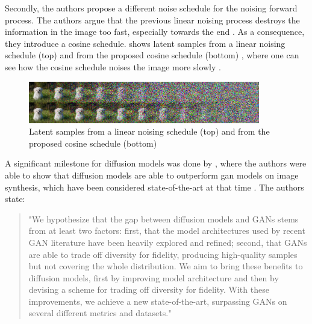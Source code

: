 Secondly, the authors propose a different noise schedule for the noising forward process.
The authors argue that the previous linear noising process destroys the information in the image too fast, especially towards the end \cite{nichol2021ImprovedDenoisingDiffusion}.
As a consequence, they introduce a cosine schedule.
 shows latent samples from a linear noising schedule (top) and from the proposed cosine schedule (bottom) \cite[Figure 3, p. 4]{nichol2021ImprovedDenoisingDiffusion}, where one can see how the cosine schedule noises the image more slowly \cite{nichol2021ImprovedDenoisingDiffusion}.

\begin{figure}[h]
    \centering
    \includegraphics[width=0.9\textwidth]{images/cosine.png}
    \caption[Noising Schedule]{Latent samples from a linear noising schedule (top) and from the proposed cosine schedule (bottom) \cite[Figure 3, p. 4]{nichol2021ImprovedDenoisingDiffusion}}
    \label{fig:cosine}
\end{figure}

A significant milestone for diffusion \glspl{model} was done by \textcite{dhariwal2021DiffusionModelsBeat}, where the authors were able to show that diffusion \glspl{model} are able to outperform \gls{gan}
\glspl{model} on image synthesis, which have been considered state-of-the-art at that time \cite{dhariwal2021DiffusionModelsBeat}.
The authors state:

\begin{quotation}
    "We hypothesize that the gap between diffusion \glspl{model} and GANs stems from at least two factors: 
    first, that the \gls{model} architectures used by recent GAN literature have been heavily explored and refined; 
    second, that GANs are able to trade off diversity for fidelity, producing high-quality samples but not covering the whole distribution. 
    We aim to bring these benefits to diffusion \glspl{model}, first by improving \gls{model} architecture and then by devising a scheme for trading off diversity for fidelity. 
    With these improvements, we achieve a new state-of-the-art, surpassing GANs on several different metrics and datasets." \cite[p. 2]{dhariwal2021DiffusionModelsBeat}
\end{quotation}


